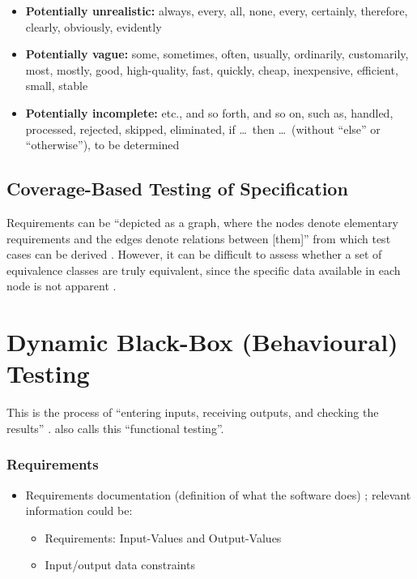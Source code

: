 \begin{itemize}
      \item \textbf{Potentially unrealistic:} always, every, all, none, every,
            certainly, therefore, clearly, obviously, evidently
      \item \textbf{Potentially vague:} some, sometimes, often, usually,
            ordinarily, customarily, most, mostly, good, high-quality, fast,
            quickly, cheap, inexpensive, efficient, small, stable
      \item \textbf{Potentially incomplete:} etc., and so forth, and so on,
            such as, handled, processed, rejected, skipped, eliminated,
            if \dots\ then \dots\ (without ``else'' or ``otherwise''),
            to be determined \citep[p.~408]{vanVliet2000}
\end{itemize}

\subsection[Coverage-Based Testing of Specification]{Coverage-Based Testing of
      Specification \citep[pp.~425-426]{vanVliet2000}}

Requirements can be ``depicted as a graph, where the nodes denote elementary
requirements and the edges denote relations between [them]'' from which test
cases can be derived \citep[p.~425]{vanVliet2000}. However, it can
be difficult to assess whether a set of equivalence classes are truly
equivalent, since the specific data available in each node is not apparent
\citep[p.~426]{vanVliet2000}.

\section[Dynamic Black-Box (Behavioural) Testing]{Dynamic Black-Box
  (Behavioural) Testing \citep[pp.~64-65]{Patton2006}}

This is the process of ``entering inputs, receiving outputs, and checking the
results'' \citep[p.~64]{Patton2006}. \citep[p.~399]{vanVliet2000}
also calls this ``functional testing''.

\subsubsection{Requirements}
\begin{itemize}
      \item Requirements documentation (definition of what the software does)
            \citep[p.~64]{Patton2006}; relevant information could be:
            \begin{itemize}
                  \item Requirements: Input-Values and Output-Values
                  \item Input/output data constraints
            \end{itemize}
\end{itemize}

